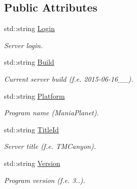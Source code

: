 \subsection*{Public Attributes}
\begin{DoxyCompactItemize}
\item 
std\-::string \hyperlink{classGbxRemote_aca6e6ee86b785451d52735daf222cc6d}{Login}
\begin{DoxyCompactList}\small\item\em Server login. \end{DoxyCompactList}\item 
std\-::string \hyperlink{classGbxRemote_a144e618f3f124b77054165d2d8519eee}{Build}
\begin{DoxyCompactList}\small\item\em Current server build (f.\-e. 2015-\/06-\/16\-\_\-\_). \end{DoxyCompactList}\item 
std\-::string \hyperlink{classGbxRemote_a0ce9914944a8f0d35f5d1bb0ddb8d292}{Platform}
\begin{DoxyCompactList}\small\item\em Program name (Mania\-Planet). \end{DoxyCompactList}\item 
std\-::string \hyperlink{classGbxRemote_a12d98a9add104392142ec8494dd022df}{Title\-Id}
\begin{DoxyCompactList}\small\item\em Server title (f.\-e. T\-M\-Canyon). \end{DoxyCompactList}\item 
std\-::string \hyperlink{classGbxRemote_a654b4cae6e4eed717d602700a90fcc27}{Version}
\begin{DoxyCompactList}\small\item\em Program version (f.\-e. 3..). \end{DoxyCompactList}\end{DoxyCompactItemize}
